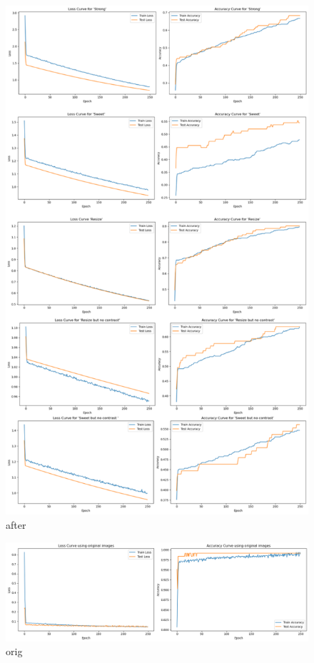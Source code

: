           \begin{figure}[H]
            \centering
            \includegraphics[scale=0.95]{figures/after.pdf} 
            \caption{after}
            \label{fig:after}
          \end{figure}

          
          \begin{figure}[H]
            \centering
            \includegraphics[scale=0.425]{figures/orig_classi.png} 
            \caption{orig}
            \label{fig:orig}
          \end{figure}

